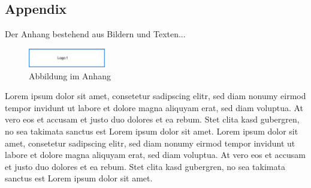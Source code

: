 \subsection*{Appendix}\label{appendix}

Der Anhang bestehend aus Bildern und Texten...

\begin{figure}[htb]
 \centering
 \includegraphics[width=0.3\textwidth,angle=0]{abb/logo1}
 \caption[Abbildung im Anhang]{Abbildung im Anhang}
\label{fig:Abbildung im Anhang}
\end{figure}

Lorem ipsum dolor sit amet, consetetur sadipscing elitr, sed diam nonumy eirmod tempor invidunt ut labore et dolore magna aliquyam erat, sed diam voluptua. At vero eos et accusam et justo duo dolores et ea rebum. Stet clita kasd gubergren, no sea takimata sanctus est Lorem ipsum dolor sit amet. Lorem ipsum dolor sit amet, consetetur sadipscing elitr, sed diam nonumy eirmod tempor invidunt ut labore et dolore magna aliquyam erat, sed diam voluptua. At vero eos et accusam et justo duo dolores et ea rebum. Stet clita kasd gubergren, no sea takimata sanctus est Lorem ipsum dolor sit amet.


